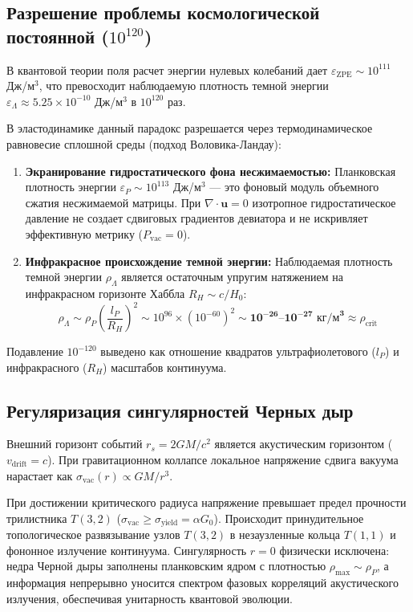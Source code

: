 \documentclass[12pt,a4paper]{article}
\begin{document}
	\subsection{Разрешение проблемы космологической постоянной ($10^{120}$)}
	В квантовой теории поля расчет энергии нулевых колебаний дает $\varepsilon_{\text{ZPE}} \sim 10^{111}$ Дж/м$^3$, что превосходит наблюдаемую плотность темной энергии $\varepsilon_\Lambda \approx 5.25 \times 10^{-10}$ Дж/м$^3$ в $10^{120}$ раз.
	
	В эластодинамике данный парадокс разрешается через термодинамическое равновесие сплошной среды (подход Воловика-Ландау):
	\begin{enumerate}
		\item \textbf{Экранирование гидростатического фона несжимаемостью:} Планковская плотность энергии $\varepsilon_P \sim 10^{113}$ Дж/м$^3$ — это фоновый модуль объемного сжатия несжимаемой матрицы. При $\nabla \cdot \mathbf{u} = 0$ изотропное гидростатическое давление не создает сдвиговых градиентов девиатора и не искривляет эффективную метрику ($P_{\text{vac}} = 0$).
		\item \textbf{Инфракрасное происхождение темной энергии:} Наблюдаемая плотность темной энергии $\rho_\Lambda$ является остаточным упругим натяжением на инфракрасном горизонте Хаббла $R_H \sim c/H_0$:
		\begin{equation}
			\rho_\Lambda \sim \rho_P \left( \frac{l_P}{R_H} \right)^2 \sim 10^{96} \times (10^{-60})^2 \sim \mathbf{10^{-26} \text{–} 10^{-27} \text{ кг/м}^3} \approx \rho_{\text{crit}}
		\end{equation}
	\end{enumerate}
	Подавление $10^{-120}$ выведено как отношение квадратов ультрафиолетового ($l_P$) и инфракрасного ($R_H$) масштабов континуума.
	
	\subsection{Регуляризация сингулярностей Черных дыр}
	Внешний горизонт событий $r_s = 2GM/c^2$ является акустическим горизонтом ($v_{\text{drift}} = c$). При гравитационном коллапсе локальное напряжение сдвига вакуума нарастает как $\sigma_{\text{vac}}(r) \propto GM/r^3$.
	
	При достижении критического радиуса напряжение превышает предел прочности трилистника $T(3,2)$ ($\sigma_{\text{vac}} \ge \sigma_{\text{yield}} = \alpha G_0$). Происходит принудительное топологическое развязывание узлов $T(3,2)$ в незаузленные кольца $T(1,1)$ и фононное излучение континуума. Сингулярность $r=0$ физически исключена: недра Черной дыры заполнены планковским ядром с плотностью $\rho_{\text{max}} \sim \rho_P$, а информация непрерывно уносится спектром фазовых корреляций акустического излучения, обеспечивая унитарность квантовой эволюции.
	
\end{document}

